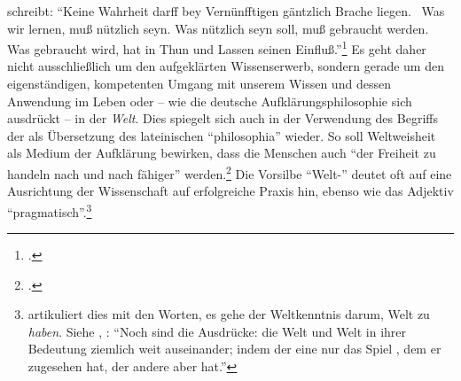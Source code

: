  schreibt: \enquote{Keine Wahrheit darff bey Vernünfftigen
gäntzlich Brache liegen. \punkt\ Was wir lernen, muß nützlich seyn. Was nützlich
seyn soll, muß gebraucht werden. Was gebraucht wird, hat in Thun und Lassen
seinen
Einfluß.}\footcite[][\S~9]{Baumgarten:GedanckenvomVernuenfftigenBeyfallaufAcademien2008}
Es geht daher nicht ausschließlich um den aufgeklärten Wissenserwerb, sondern
gerade um den eigenständigen, kompetenten Umgang mit unserem Wissen und dessen
Anwendung im Leben oder -- wie die deutsche Aufklärungsphilosophie sich
ausdrückt -- in der \emph{Welt}. Dies spiegelt sich auch in der Verwendung des
Begriffs der  als Übersetzung des lateinischen
\enquote{philosophia} wieder. So soll Weltweisheit als Medium der Aufklärung
bewirken, dass die Menschen auch
\enquote{der Freiheit zu handeln nach und nach fähiger}
werden.\footnote{\cite[][A
493\,f.,]{Kant:BeantwortungderFrage:WasistAufklaerung?1977}
\cite[][VIII: 41.36]{Kant:GesammelteWerke1900ff.}.} Die Vorsilbe \enquote{Welt-}
deutet oft auf eine Ausrichtung der Wissenschaft auf erfolgreiche
Praxis hin, ebenso wie das Adjektiv \enquote{pragmatisch}.\footnote{
artikuliert dies mit den Worten, es gehe der Weltkenntnis darum, Welt zu \emph{haben}. Siehe
\cite[BA~vii]{Kant:AnthropologieinpragmatischerHinsicht1977}, \cite[VII:
120.9--11]{Kant:GesammelteWerke1900ff.}: \enquote{Noch sind die Ausdrücke:
die Welt  und Welt  in ihrer Bedeutung ziemlich weit
auseinander; indem der eine nur das Spiel , dem er zugesehen
hat, der andere aber  hat.}}


